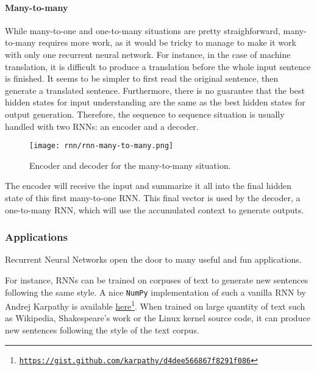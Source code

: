 \paragraph*{Many-to-many}
While many-to-one and one-to-many situations are pretty straighforward, many-to-many requires more work, as it would be tricky to manage to make it work with only one recurrent neural network. For instance, in the case of machine translation, it is difficult to produce a translation before the whole input sentence is finished. It seems to be simpler to first read the original sentence, then generate a translated sentence. Furthermore, there is no guarantee that the best hidden states for input understanding are the same as the best hidden states for output generation. Therefore, the sequence to sequence situation is usually handled with two RNNs: an encoder and a decoder.
\begin{figure}[H]
    \centering
    \texttt{[image: rnn/rnn-many-to-many.png]}
    \caption{Encoder and decoder for the many-to-many situation.}
\end{figure}
The encoder will receive the input and summarize it all into the final hidden state of this first many-to-one RNN. This final vector is used by the decoder, a one-to-many RNN, which will use the accumulated context to generate outputs.

\subsubsection{Applications}
Recurrent Neural Networks open the door to many useful and fun applications.

For instance, RNNs can be trained on corpuses of text to generate new sentences following the same style. A nice \texttt{NumPy} implementation of such a vanilla RNN by Andrej Karpathy is available \href{https://gist.github.com/karpathy/d4dee566867f8291f086}{here}\footnote{\href{https://gist.github.com/karpathy/d4dee566867f8291f086}{\nolinkurl{https://gist.github.com/karpathy/d4dee566867f8291f086}}}. When trained on large quantity of text such as Wikipedia, Shakespeare's work or the Linux kernel source code, it can produce new sentences following the style of the text corpus.

